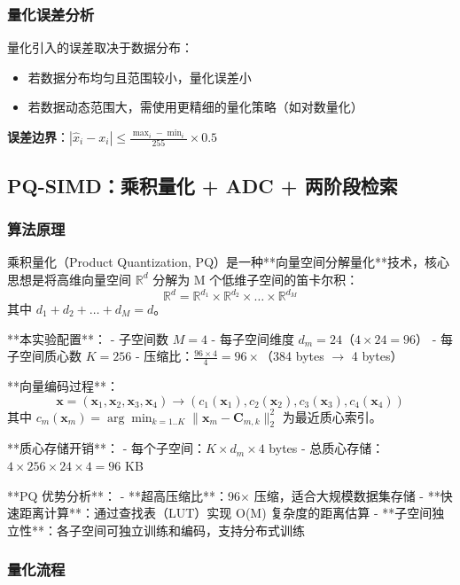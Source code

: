 \documentclass[a4paper]{article}
\begin{document}
\subsubsection{量化误差分析}

量化引入的误差取决于数据分布：
\begin{itemize}
  \item 若数据分布均匀且范围较小，量化误差小
  \item 若数据动态范围大，需使用更精细的量化策略（如对数量化）
\end{itemize}

\textbf{误差边界}：$|\hat{x}_i - x_i| \leq \frac{\max_i - \min_i}{255} \times 0.5$

\subsection{PQ-SIMD：乘积量化 + ADC + 两阶段检索}

\subsubsection{算法原理}

乘积量化（Product Quantization, PQ）是一种**向量空间分解量化**技术，核心思想是将高维向量空间 $\mathbb{R}^d$ 分解为 M 个低维子空间的笛卡尔积：
$$\mathbb{R}^d = \mathbb{R}^{d_1} \times \mathbb{R}^{d_2} \times \dots \times \mathbb{R}^{d_M}$$
其中 $d_1 + d_2 + \dots + d_M = d$。

**本实验配置**：
- 子空间数 $M=4$
- 每子空间维度 $d_m=24$（$4 \times 24 = 96$）
- 每子空间质心数 $K=256$
- 压缩比：$\frac{96 \times 4}{4} = 96\times$（384 bytes $\rightarrow$ 4 bytes）

**向量编码过程**：
$$\mathbf{x} = (\mathbf{x}_1, \mathbf{x}_2, \mathbf{x}_3, \mathbf{x}_4) \rightarrow (c_1(\mathbf{x}_1), c_2(\mathbf{x}_2), c_3(\mathbf{x}_3), c_4(\mathbf{x}_4))$$
其中 $c_m(\mathbf{x}_m) = \arg\min_{k=1..K} \|\mathbf{x}_m - \mathbf{C}_{m,k}\|_2^2$ 为最近质心索引。

**质心存储开销**：
- 每个子空间：$K \times d_m \times 4$ bytes
- 总质心存储：$4 \times 256 \times 24 \times 4 = 96$ KB

**PQ 优势分析**：
- **超高压缩比**：96$\times$ 压缩，适合大规模数据集存储
- **快速距离计算**：通过查找表（LUT）实现 O(M) 复杂度的距离估算
- **子空间独立性**：各子空间可独立训练和编码，支持分布式训练

\subsubsection{量化流程}
\end{document}
